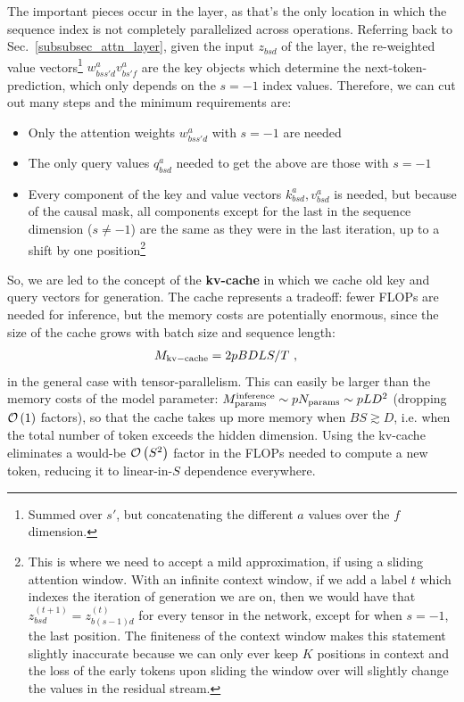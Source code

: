 \documentclass[11pt]{article}
\begin{document}
The important pieces occur in the  layer, as that's the only location in
which the sequence index is not completely parallelized across operations. Referring back to
Sec.~\ref{subsubsec_attn_layer}, given the input $ z _{ bsd } $ of the 
layer, the re-weighted value vectors\footnote{Summed over $ s' $, but concatenating the different $
		a $ values over the $ f $ dimension.} $ w ^{ a }_{ bss'd } v ^{ a } _{ bs'f } $ are the key objects
which determine the next-token-prediction, which only depends on the $ s=-1 $ index values.
Therefore, we can cut out many steps and the minimum requirements are:
\begin{itemize}
	\item Only the attention weights $ w ^{ a }_{ bss'd }$ with $ s=-1 $ are needed
	\item The only query values $ q ^{ a }_{ bsd } $ needed to get the above are those with $ s=-1 $
	\item Every component of the key and value vectors $k ^{ a }_{ bsd }, v ^{ a }_{ bsd } $ is
          needed, but because of the causal mask, all components except for the last in the sequence
          dimension ($ s\neq -1 $) are the same as they were in the last iteration, up to a shift by
          one position\footnote{This is where we need to accept a mild approximation, if using a
              sliding attention window. With an infinite context window, if we add a label $ t $
              which indexes the iteration of generation we are on, then we would have that $ z ^{
              (t+1) } _{ bsd } = z ^{ (t)} _{ b (s-1)d } $ for every tensor in the network, except
              for when $ s=-1 $, the last position. The finiteness of the context window makes this
              statement slightly inaccurate because we can only ever keep $ K $ positions in context
              and the loss of the early tokens upon sliding the window over will slightly change the
          values in the residual stream.}
\end{itemize}

So, we are led to the concept of the \textbf{kv-cache} in which we cache old key and query vectors for generation.
The cache represents a tradeoff: fewer FLOPs are needed for inference, but the memory costs are potentially
enormous, since the size of the cache grows with batch size and sequence length:
\begin{align}
	M _{ {\rm kv-cache}  } & = 2pBDLS /T\ ,  \label{eq_kv_cache_memory}
\end{align}
in the general case with tensor-parallelism. This can easily be larger than the memory costs of the
model parameter: $ M _{ {\rm params}  } ^{ {\rm  inference}  } \sim p N _{ {\rm params}  } \sim p LD
^{ 2 }  $ (dropping $ \mathcal{O} \left( 1 \right)  $ factors), so that the cache takes up more memory
when $ BS \gtrsim D $, i.e. when the total number of token exceeds the hidden dimension. Using the
kv-cache eliminates a would-be $ \mathcal{O} \left( S ^{ 2 } \right)  $ factor in the FLOPs needed to
compute a new token, reducing it to linear-in-$ S $ dependence everywhere.
\end{document}
